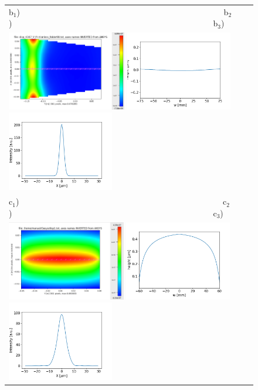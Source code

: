 \documentclass[]{spie}  %
\begin{document}
\begin{figure} [ht]
\begin{center}
\begin{tabular}{l}
  b$_1$)~~~~~~~~~~~~~~~~~~~~~~~~~~~~~~~~~~~~~~~~~~~~~~~~~
  b$_2$)~~~~~~~~~~~~~~~~~~~~~~~~~~~~~~~~~~~~~~~~~~~~~~~~~b$_3$)\\
  \includegraphics[height=3.5cm]{figures/cryogenic2dKh.png}
  \includegraphics[height=3.5cm]{figures/deformationcryogenic1dKh.png}
  \includegraphics[height=3.5cm]{figures/intensitycryogenicKh.png} \\
   
   c$_1$)~~~~~~~~~~~~~~~~~~~~~~~~~~~~~~~~~~~~~~~~~~~~~~~~~
   c$_2$)~~~~~~~~~~~~~~~~~~~~~~~~~~~~~~~~~~~~~~~~~~~~~~~~~c$_3$)\\ 
   \includegraphics[height=3.5cm]{figures/water1_2d.png}
   \includegraphics[height=3.5cm]{figures/deformationwater1_1d.png}   
   \includegraphics[height=3.5cm]{figures/intensitywater1.png} \\


\end{tabular}
\end{center}
\end{figure}
\end{document}
